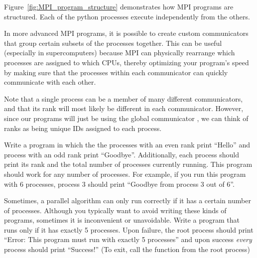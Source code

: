 Figure~\ref{fig:MPI_program_structure} demonstrates how MPI programs are
structured. Each of the python processes execute independently from the others.

\begin{info}
In more advanced MPI programs, it is possible to create custom communicators
that group certain subsets of the processes together. This can be useful
(especially in supercomputers) because MPI can physically rearrange which
processes are assigned to which CPUs, thereby optimizing your program's speed by
making sure that the processes within each communicator can quickly communicate
with each other.

Note that a single process can be a member of many different communicators, and
that its rank will most likely be different in each communicator. However, since
our programs will just be using the global communicator , we
can think of ranks as being unique IDs assigned to each process.
\end{info}

\begin{problem}
Write a program in which the the processes with an even rank print ``Hello'' and
process with an odd rank print ``Goodbye''. Additionally, each process should
print its rank and the total number of processes currently running. This program
should work for any number of processes. For example, if you run this program
with 6 processes, process 3 should print ``Goodbye from process 3 out of 6''.
\end{problem}

\begin{problem}
Sometimes, a parallel algorithm can only run correctly if it has a certain
number of processes. Although you typically want to avoid writing these kinds of
programs, sometimes it is inconvenient or unavoidable. Write a program that runs
only if it has exactly 5 processes. Upon failure, the root process should print
``Error: This program must run with exactly 5 processes'' and upon success
\emph{every} process should print ``Success!'' (To exit, call the function
 from the root process)
\end{problem}




















